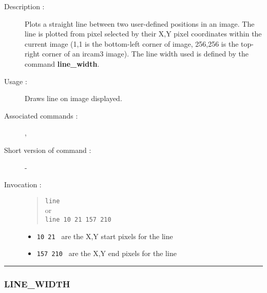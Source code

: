 \begin{description}

\item[Description :] Plots a straight line between two user-defined
positions in an image.  The line is plotted from pixel selected by
their X,Y pixel coordinates within the current image (1,1 is the
bottom-left corner of image, 256,256 is the top-right corner of an {\sc
ircam3} image).  The line width used is defined by the command {\bf
line\_width}.

\item[Usage :] Draws line on image displayed.
\item[Associated commands :] {\tt {}}, 
{\tt {}}
\item[Short version of command :] -
\item[Invocation :]

\begin{quote}{\tt  line }\\
or \\
{\tt line 10 21 157 210 }
\end{quote}

\begin{itemize}

\item {\tt 10 21 } are the X,Y start pixels for the line
\item {\tt 157 210 } are the X,Y end pixels for the line
\end{itemize}

\end{description}

\hrule 
\subsubsection*{\label{LINE_WIDTH}LINE\_WIDTH}

